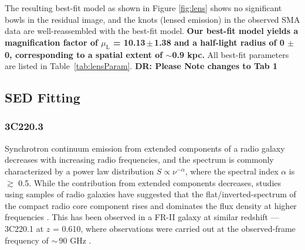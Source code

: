 \documentclass[iop, revtex4]{emulateapj}
\newcommand{\Msun}{\mbox{$M_{\odot}$}}
\begin{document}
The resulting best-fit model as shown in Figure\,\,\ref{fig:lens} shows no significant bowls in the residual
image, and the knots (lensed emission) in the observed SMA data are well-reassembled with the best-fit model.
{\bf  Our best-fit model yields a magnification
factor of $\mu_\textrm{L}$ = 10.13\,$\pm$\,1.38
and a half-light radius of 0 $\pm$ 0, corresponding to a spatial extent of $\sim$0.9 kpc.} 
All best-fit
parameters are listed in Table~\ref{tab:lensParam}. {\bf DR: Please Note changes to Tab 1}


\subsection{SED Fitting} \label{sec:SED}
\subsubsection{3C220.3}\label{sec:SEDFg}
Synchrotron continuum emission from extended components of a radio galaxy decreases with increasing radio frequencies,
and the spectrum is commonly characterized by a power law distribution $S \propto \nu^{-\alpha}$, where the
spectral index $\alpha$ is $\gtrsim$ 0.5. While the contribution from extended components decreases, studies using
samples of radio galaxies have suggested that the flat/inverted-spectrum of the compact radio core component rises
and dominates the flux density at higher frequencies \citep{Kellermann81a,Begelman84a}. This has been observed in a FR-II galaxy at similar redshift --- 3C220.1 at $z$ = 0.610, where observations were carried out at the observed-frame frequency of $\sim$\,90 GHz \citep{Hardcastle08a}.
\end{document}
